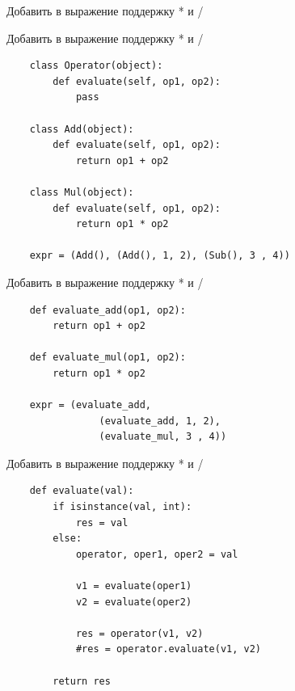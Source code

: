\documentclass{article}
\begin{document}
\begin{center} Добавить в выражение поддержку * и / \end{center}
\newpage

\begin{center} Добавить в выражение поддержку * и / \end{center}
\begin{lstlisting}
    class Operator(object):
        def evaluate(self, op1, op2):
            pass

    class Add(object):
        def evaluate(self, op1, op2):
            return op1 + op2

    class Mul(object):
        def evaluate(self, op1, op2):
            return op1 * op2

    expr = (Add(), (Add(), 1, 2), (Sub(), 3 , 4))
\end{lstlisting}
\newpage

\begin{center} Добавить в выражение поддержку * и / \end{center}
\begin{lstlisting}
    def evaluate_add(op1, op2):
        return op1 + op2

    def evaluate_mul(op1, op2):
        return op1 * op2

    expr = (evaluate_add,
                (evaluate_add, 1, 2), 
                (evaluate_mul, 3 , 4))
\end{lstlisting}
\newpage

\begin{center} Добавить в выражение поддержку * и / \end{center}
\begin{lstlisting}
    def evaluate(val):
        if isinstance(val, int):
            res = val
        else:
            operator, oper1, oper2 = val

            v1 = evaluate(oper1)
            v2 = evaluate(oper2)
            
            res = operator(v1, v2)
            #res = operator.evaluate(v1, v2)

        return res
\end{lstlisting}
\newpage
\end{document}
